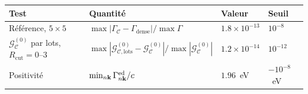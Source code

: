 \begin{tabular}{l l l l}
    \hline\hline
    Test & Quantité & Valeur & Seuil \\
    \hline
    Référence, $5\times5$                                           & $\max|\Gamma_\mathcal{C}-\Gamma_\text{dense}|/\max\Gamma$                                                             & $1.8\times10^{-13}$ & $10^{-8}$ \\
    $\mathcal{G}^{(0)}_\mathcal{C}$ par lots, $R_\text{cut}=0$--$3$ & $\max|\mathcal{G}^{(0)}_{\mathcal{C},\text{lots}}-\mathcal{G}^{(0)}_\mathcal{C}|/\max|\mathcal{G}^{(0)}_\mathcal{C}|$ & $1.2\times10^{-14}$ & $10^{-12}$ \\
    Positivité                                                      & $\min_{n\mathbf{k}}\Gamma^\text{ed}_{n\mathbf{k}}/c$                                                                                & $1.96$~eV           & $-10^{-8}$~eV \\
    \hline\hline
\end{tabular}
